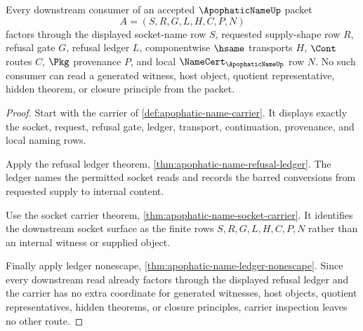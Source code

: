 \begin{theorem}
\label{thm:apophatic-name-root-unblock-refusal-boundary}
Every downstream consumer of an accepted $\ApophaticNameUp$ packet
$$
A=(S,R,G,L,H,C,P,N)
$$
factors through the displayed socket-name row $S$, requested supply-shape row $R$, refusal gate $G$, refusal ledger $L$, componentwise $\hsame$ transports $H$, $\Cont$ routes $C$, $\Pkg$ provenance $P$, and local $\NameCert_{\ApophaticNameUp}$ row $N$. No such consumer can read a generated witness, host object, quotient representative, hidden theorem, or closure principle from the packet.
\end{theorem}
\begin{proof}
Start with the carrier of \autoref{def:apophatic-name-carrier}. It displays exactly the socket, request, refusal gate, ledger, transport, continuation, provenance, and local naming rows.

Apply the refusal ledger theorem, \autoref{thm:apophatic-name-refusal-ledger}. The ledger names the permitted socket reads and records the barred conversions from requested supply to internal content.

Use the socket carrier theorem, \autoref{thm:apophatic-name-socket-carrier}. It identifies the downstream socket surface as the finite rows $S,R,G,L,H,C,P,N$ rather than an internal witness or supplied object.

Finally apply ledger nonescape, \autoref{thm:apophatic-name-ledger-nonescape}. Since every downstream read already factors through the displayed refusal ledger and the carrier has no extra coordinate for generated witnesses, host objects, quotient representatives, hidden theorems, or closure principles, carrier inspection leaves no other route.
\end{proof}

